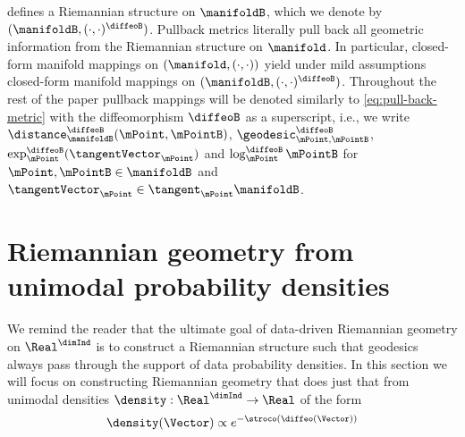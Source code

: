 defines a Riemannian structure on $\manifoldB$, which we denote by $(\manifoldB, (\cdot,\cdot)^\diffeoB)$. 
Pullback metrics literally pull back all geometric information from the Riemannian structure on $\manifold$. In particular, closed-form manifold mappings on $(\manifold, (\cdot,\cdot))$ yield under mild assumptions closed-form manifold mappings on $(\manifoldB, (\cdot,\cdot)^\diffeoB)$.
Throughout the rest of the paper pullback mappings will be denoted similarly to \ref{eq:pull-back-metric} with the diffeomorphism $\diffeoB$ as a superscript, i.e., we write $\distance^\diffeoB_{\manifoldB}(\mPoint, \mPointB)$, $\geodesic^\diffeoB_{\mPoint, \mPointB}$, $\exp^\diffeoB_\mPoint (\tangentVector_\mPoint)$ and $\log^\diffeoB_{\mPoint} \mPointB$ 
for $\mPoint,\mPointB \in \manifoldB$ and $\tangentVector_\mPoint \in \tangent_\mPoint \manifoldB$. 

\section{Riemannian geometry from unimodal probability densities}
\label{sec:unimodal-riemannian geometry}

We remind the reader that the ultimate goal of data-driven Riemannian geometry on $\Real^\dimInd$ is to construct a Riemannian structure such that geodesics always pass through the support of data probability densities. In this section we will focus on constructing Riemannian geometry that does just that from unimodal densities $\density:\Real^\dimInd\to \Real$ of the form
\begin{equation}
    \density(\Vector) \propto e^{- \stroco(\diffeo(\Vector))}
    \label{eq:stroco-diffeo-density}
\end{equation}

